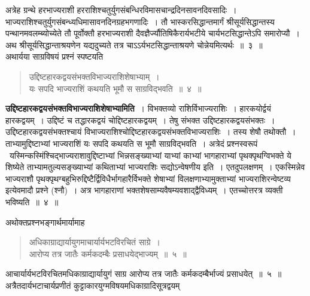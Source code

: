 \documentclass[11pt, openany]{book}
\begin{document}
\indent
अत्रेह ग्रन्थे हरभाज्यराशी हरराशिश्चतुर्युगसंबन्धिरविमासचान्द्रदिनसावनदिवसादिः~। भाज्यराशिश्चतुर्युगसंबन्ध्यधिमासावनदिनग्रहभगणादिः~। तौ भास्करसिद्धान्तमार्गं श्रीसूर्यसिद्धान्तस्य पन्थानमवलम्ब्योच्येते तौ पूर्वोक्तौ हरभाज्यराशी दैवज्ञैर्ज्यौतिषिकैरार्यभटीये चार्यभटसिद्धान्तेऽपि समारोप्यौ~। अथ श्रीसूर्यसिद्धान्ताश्रयणेन यद्यदुच्यते तत्र चाऽऽर्यभटसिद्धान्ताश्रयणे चोन्नेयमित्यर्थः~॥~३~॥\\

\noindent अथार्यया साग्रविषयं प्रश्नं स्पष्टयति\textendash

\begin{quote}
\ks
उद्दिष्टहारकद्वयसंभक्तविभाज्यराशिशेषाभ्याम्~।\\
यः सपदि भाज्यराशिं कथयति भूमौ स साग्रविद्भवति~॥~४~॥
\end{quote}

\indent
\textbf{उद्दिष्टहारकद्वयसंभक्तविभाज्यराशिशेषाभ्यामिति~}। विभक्तव्यो राशिर्विभाज्यराशिः~। हारकयोर्द्वयं हारकद्वयम्~। उद्दिष्टं च तद्धारकद्वयं चोद्दिष्टहारकद्वयम्~। तेषु संभक्त उद्दिष्टहारकद्वयसंभक्तः~। उद्दिष्टहारकद्वयसंभक्तश्चायं विभाज्यराशिश्चोद्दिष्टहारकद्वयसंभक्तविभाज्यराशिः~। तस्य शेषौ तथोक्तौ~। ताभ्यामुद्दिष्टाभ्यां भाज्यराशिं यः सपदि कथयति स भूमौ साग्रविद्भवति~। अत्रेदं प्रश्नस्वरूपं \textendash\ यस्मिन्कस्मिंश्चिद्भाज्यराशावुद्दिष्टाभ्यां भिन्नसङ्ख्याभ्यां याभ्यां काभ्यां भागहाराभ्यां पृथक्पृथग्विभक्ते ये शिष्येते ताभ्यामतुल्यसङ्ख्याभ्यां कथिताभ्यां भाज्यराशिः सद्योऽन्वेषणीय इति~। एतदुपलक्षणम्~। एकस्मिन्नेव भाज्यराशौ पृथक्पृथग्बहुभिरुद्दिष्टैर्द्विविधैर्भागहारैर्विभक्ते शेषाभ्यां विलक्षणाभ्यामुक्ताभ्यां भाज्यराशिरन्वेष्टव्य इत्येवमादौ प्रश्ने (श्नौ)~। अत्र भागहाराणां भक्तशेषसाम्यवैषम्यवशाद्द्वैविध्यम्~। एतच्चोत्तरत्र व्यक्ती भविष्यति~॥~४~॥

\newpage
\thispagestyle{fancy}
\fancyhf{}

\indent
अथोक्तप्रश्नभङ्गार्थमार्यामाह\textendash
\begin{quote}
\ks
अधिकाग्राद्यार्यायुगमाचार्यार्यभटविरचितं साग्रे~।\\
आरोप्य तत्र जातैः कर्मकदम्बैः प्रसाधयेद्भाज्यम्~॥~५~॥
\end{quote}

\indent
आचार्यार्यभटविरचितमधिकाग्राद्यार्यायुगं साग्र आरोप्य तत्र जातैः कर्मकदम्बैर्भाज्यं प्रसाधयेत्~॥~५~॥\\

\indent
अत्रैतदार्यभटाचार्यप्रणीतं कुट्टाकारयुग्मविषयमधिकाग्रादिसूत्रद्वयम् \textendash
\end{document}
